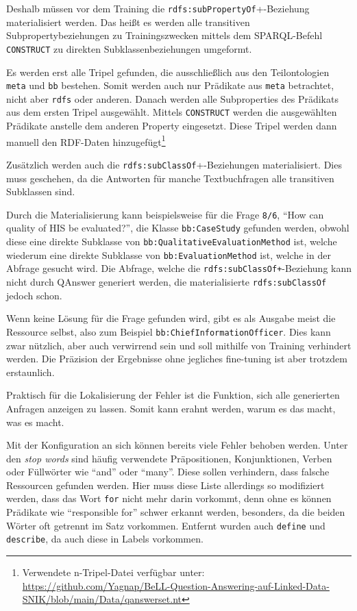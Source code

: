 \documentclass[utf8,biblatex]{lni}
\begin{document}
Deshalb müssen vor dem Training die \texttt{rdfs:subPropertyOf}+-Beziehung materialisiert werden.
Das heißt es werden alle transitiven Subpropertybeziehungen zu Trainingszwecken mittels dem SPARQL-Befehl \texttt{CONSTRUCT} zu direkten Subklassenbeziehungen umgeformt.

Es werden erst alle Tripel gefunden, die ausschließlich aus den Teilontologien \texttt{meta} und \texttt{bb} bestehen.
Somit werden auch nur Prädikate aus \texttt{meta} betrachtet, nicht aber \texttt{rdfs} oder anderen.
Danach werden alle Subproperties des Prädikats aus dem ersten Tripel ausgewählt.
Mittels \texttt{CONSTRUCT} werden die ausgewählten Prädikate anstelle dem anderen Property eingesetzt.
Diese Tripel werden dann manuell den RDF-Daten hinzugefügt\footnote{Verwendete n-Tripel-Datei verfügbar unter:\\\url{https://github.com/Yagnap/BeLL-Question-Answering-auf-Linked-Data-SNIK/blob/main/Data/qanswerset.nt}}

Zusätzlich werden auch die \texttt{rdfs:subClassOf}+-Beziehungen materialisiert.
Dies muss geschehen, da die Antworten für manche Textbuchfragen alle transitiven Subklassen sind.

Durch die Materialisierung kann beispielsweise für die Frage \texttt{8/6}, \enquote{How can quality of HIS be evaluated?},
die Klasse \texttt{bb:CaseStudy} gefunden werden, obwohl diese eine direkte Subklasse von \texttt{bb:QualitativeEvaluationMethod} ist,
welche wiederum eine direkte Subklasse von \texttt{bb:EvaluationMethod} ist, welche in der Abfrage gesucht wird.
Die Abfrage, welche die \texttt{rdfs:subClassOf+}-Beziehung kann nicht durch QAnswer generiert werden, die materialisierte \texttt{rdfs:subClassOf} jedoch schon.

Wenn keine Lösung für die Frage gefunden wird, gibt es als Ausgabe meist die Ressource selbst, also zum Beispiel \texttt{bb:ChiefInformationOfficer}.
Dies kann zwar nützlich, aber auch verwirrend sein und soll mithilfe von Training verhindert werden.
Die Präzision der Ergebnisse ohne jegliches fine-tuning ist aber trotzdem erstaunlich.

Praktisch für die Lokalisierung der Fehler ist die Funktion, sich alle generierten Anfragen anzeigen zu lassen.
Somit kann erahnt werden, warum es das macht, was es macht.

Mit der Konfiguration an sich können bereits viele Fehler behoben werden.
Unter den \emph{stop words} sind häufig verwendete Präpositionen, Konjunktionen, Verben oder Füllwörter wie \enquote{and} oder \enquote{many}.
Diese sollen verhindern, dass falsche Ressourcen gefunden werden.
Hier muss diese Liste allerdings so modifiziert werden, dass das Wort \texttt{for} nicht mehr darin vorkommt, denn ohne es können Prädikate wie \enquote{responsible for} schwer erkannt werden,
besonders, da die beiden Wörter oft getrennt im Satz vorkommen.
Entfernt wurden auch \texttt{define} und \texttt{describe}, da auch diese in Labels vorkommen.
\end{document}
